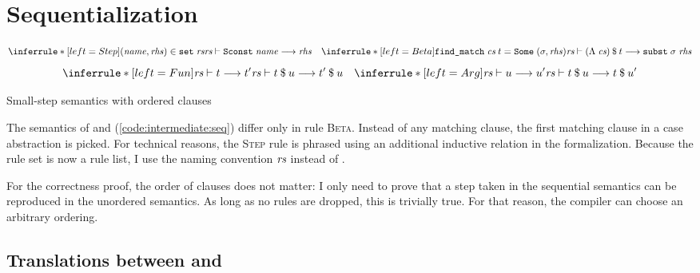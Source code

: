 
\section{Sequentialization}
\label{sec:intermediate:seq}


\begin{code}[t]
  \[
    \inferrule*[left=Step]{(\mathit{name}, \mathit{rhs}) \in \holconst{set}\;\rs}{\rewrite{\rs}{\holconst{Sconst}\;\mathit{name}}{\mathit{rhs}}}
    \quad
    \inferrule*[left=Beta]{\holconst{find\_match}\;\cs\;t = \holconst{Some}\;(\sigma, \mathit{rhs})}{\rewrite{\rs}{\app{(\Lambda\; \cs)}{t}}{\holconst{subst}\;\sigma\;\mathit{rhs}}}
  \]
  \[
    \inferrule*[left=Fun]{\rewrite{\rs}{t}{t'}}{\rewrite{\rs}{\app t u}{\app{t'}{u}}}
    \quad
    \inferrule*[left=Arg]{\rewrite{\rs}{u}{u'}}{\rewrite{\rs}{\app t u}{\app{t}{u'}}}
  \]
  \caption{Small-step semantics with ordered clauses}
  \label{code:intermediate:seq}
\end{code}

\noindent
The semantics of  and  (\cref{code:intermediate:seq}) differ only in rule \textsc{Beta}.
Instead of any matching clause, the first matching clause in a case abstraction is picked.
For technical reasons, the \textsc{Step} rule is phrased using an additional inductive relation in the formalization.
Because the rule set is now a rule list, I use the naming convention $\textit{rs}$ instead of \R.

For the correctness proof, the order of clauses does not matter:
I only need to prove that a step taken in the sequential semantics can be reproduced in the unordered semantics.
As long as no rules are dropped, this is trivially true.
For that reason, the compiler can choose an arbitrary ordering.


\subsection{Translations between  and }

